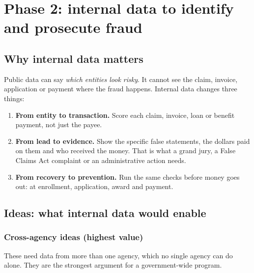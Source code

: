\documentclass[letterpaper,11pt]{article}
\providecommand{\tightlist}{\setlength{\itemsep}{0pt}\setlength{\parskip}{0pt}}
\begin{document}
\hypertarget{phase-2-internal-data-to-identify-and-prosecute-fraud}{%
\section{Phase 2: internal data to identify and prosecute
fraud}\label{phase-2-internal-data-to-identify-and-prosecute-fraud}}

\hypertarget{why-internal-data-matters}{%
\subsection{Why internal data matters}\label{why-internal-data-matters}}

Public data can say \emph{which entities look risky}. It cannot see the
claim, invoice, application or payment where the fraud happens. Internal
data changes three things:

\begin{enumerate}
\def\labelenumi{\arabic{enumi}.}
\tightlist
\item
  \textbf{From entity to transaction.} Score each claim, invoice, loan
  or benefit payment, not just the payee.
\item
  \textbf{From lead to evidence.} Show the specific false statements,
  the dollars paid on them and who received the money. That is what a
  grand jury, a False Claims Act complaint or an administrative action
  needs.
\item
  \textbf{From recovery to prevention.} Run the same checks before money
  goes out: at enrollment, application, award and payment.
\end{enumerate}

\hypertarget{ideas-what-internal-data-would-enable}{%
\subsection{Ideas: what internal data would
enable}\label{ideas-what-internal-data-would-enable}}

\hypertarget{cross-agency-ideas-highest-value}{%
\subsubsection{Cross-agency ideas (highest
value)}\label{cross-agency-ideas-highest-value}}

These need data from more than one agency, which no single agency can do
alone. They are the strongest argument for a government-wide program.
\end{document}
